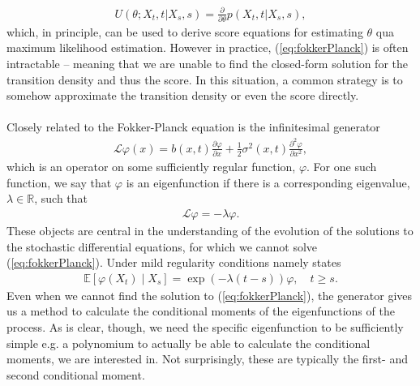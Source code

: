 \begin{align}
    U(\theta; X_t, t | X_s, s) = \frac{\partial}{\partial\theta}p(X_t, t | X_s, s), \label{eq:transitionScore}
\end{align}
which, in principle, can be used to derive score equations for estimating $\theta$ qua maximum likelihood estimation. However in practice, (\ref{eq:fokkerPlanck}) is often intractable – meaning that we are unable to find the closed-form solution for the transition density and thus the score. In this situation, a common strategy is to somehow approximate the transition density or even the score directly. \\\\
Closely related to the Fokker-Planck equation is the infinitesimal generator 
\begin{align}
    \mathcal{L}\varphi(x) = b(x, t) \frac{\partial\varphi}{\partial x} + \frac{1}{2}\sigma^2(x, t)\frac{\partial^2\varphi}{\partial x^2} \label{eq:infinitesemalGeneratorDefinition},
\end{align}
which is an operator on some sufficiently regular function, $\varphi$. For one such function, we say that $\varphi$ is an eigenfunction if there is a corresponding eigenvalue, $\lambda\in\mathbb{R}$, such that
\begin{align}
    \mathcal{L}\varphi = -\lambda\varphi.
\end{align} 
These objects are central in the understanding of the evolution of the solutions to the stochastic differential equations, for which we cannot solve (\ref{eq:fokkerPlanck}). Under mild regularity conditions \cite[theorem 1.16]{StatisticalMethodsForSDE} namely states
\begin{align}
    \mathbb{E}\left[\varphi(X_{t}) \middle | X_{s}\right] = \exp\left(-\lambda \left(t - s\right)\right)\varphi \label{eq:momentConditions}, \quad t\geq s.
\end{align}
Even when we cannot find the solution to (\ref{eq:fokkerPlanck}), the generator gives us a method to calculate the conditional moments of the eigenfunctions of the process.
As is clear, though, we need the specific eigenfunction to be sufficiently simple e.g. a polynomium to actually be able to calculate the conditional moments, we are interested in. Not surprisingly, these are typically the first- and second conditional moment.
